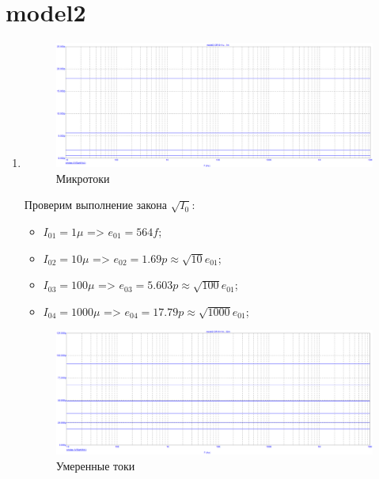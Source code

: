\documentclass[a4paper, 12pt]{article}%
\begin{document}
\section{\textbf{model2}}

\begin{enumerate}

\item

\begin{figure}[h!]
    \centering
    \includegraphics[scale=0.3]{images/mod2_1_1.png}
    \caption{Микротоки}
    \label{fig:m211}
\end{figure}

Проверим выполнение закона $\sqrt{I_0}$:
\begin{itemize}
    \item $I_{01} = 1\mu$ => $e_{01} = 564f$;
    \item $I_{02} = 10\mu$ => $e_{02} = 1.69p \approx \sqrt{10}e_{01}$;
    \item $I_{03} = 100\mu$ => $e_{03} = 5.603p \approx \sqrt{100}e_{01}$; 
    \item $I_{04} = 1000\mu$ => $e_{04} = 17.79p \approx \sqrt{1000}e_{01}$;
\end{itemize}

\begin{figure}[h!]
    \centering
    \includegraphics[scale=0.3]{images/mod2_1_2.png}
    \caption{Умеренные токи}
    \label{fig:m212}
\end{figure}


\end{enumerate}
\end{document}
